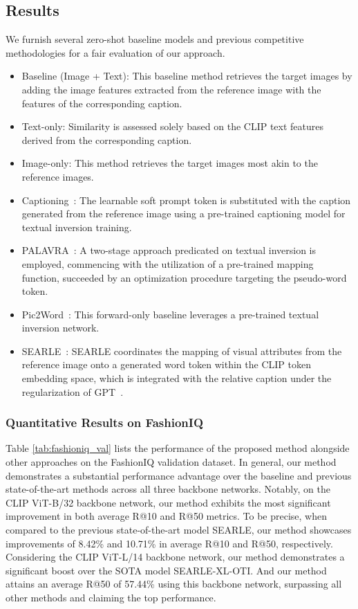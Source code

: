\documentclass[10pt,twocolumn,letterpaper]{article}
\begin{document}
\subsection{Results}
We furnish several zero-shot baseline models and previous competitive methodologies for a fair evaluation of our approach.

\begin{itemize}
    \item Baseline (Image + Text): This baseline method retrieves the target images by adding the image features extracted from the reference image with the features of the corresponding caption.
    \item Text-only: Similarity is assessed solely based on the CLIP text features derived from the corresponding caption.
    \item Image-only: This method retrieves the target images most akin to the reference images.
    \item Captioning~\cite{Baldrati_2023_ICCV}: The learnable soft prompt token is substituted with the caption generated from the reference image using a pre-trained captioning model for textual inversion training.
    \item PALAVRA~\cite{cohen2022my}: A two-stage approach predicated on textual inversion is employed, commencing with the utilization of a pre-trained mapping function, succeeded by an optimization procedure targeting the pseudo-word token.
    \item Pic2Word~\cite{saito2023pic2word}: This forward-only baseline leverages a pre-trained textual inversion network.
    \item SEARLE~\cite{Baldrati_2023_ICCV}: SEARLE coordinates the mapping of visual attributes from the reference image onto a generated word token within the CLIP token embedding space, which is integrated with the relative caption under the regularization of GPT~\cite{brown2020language}.
\end{itemize}



\subsubsection{Quantitative Results on FashionIQ}


Table \ref{tab:fashioniq_val} lists the performance of the proposed method alongside other approaches on the FashionIQ validation dataset. In general, our method demonstrates a substantial performance advantage over the baseline and previous state-of-the-art methods across all three backbone networks. Notably, on the CLIP ViT-B/32 backbone network, our method exhibits the most significant improvement in both average R@10 and R@50 metrics. To be precise, when compared to the previous state-of-the-art model SEARLE, our method showcases improvements of 8.42\% and 10.71\% in average R@10 and R@50, respectively. Considering the CLIP ViT-L/14 backbone network, our method demonstrates a significant boost over the SOTA model SEARLE-XL-OTI. And our method attains an average R@50 of 57.44\% using this backbone network, surpassing all other methods and claiming the top performance. 
\end{document}
